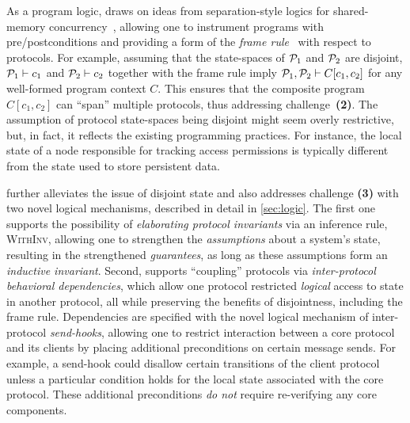 As a program logic, \disel draws on ideas from separation-style logics
for shared-memory
concurrency~\cite{Nanevski-al:ESOP14,Turon-al:OOPSLA14}, allowing one
to instrument programs with pre/postconditions and providing a form of
the \emph{frame rule}~\cite{Reynolds:LICS02} with respect to
protocols. For example, assuming that the state-spaces of $\mathcal{P}_1$ and
$\mathcal{P}_2$ are disjoint, $\mathcal{P}_1 \vdash c_1$ and $\mathcal{P}_2 \vdash c_2$
together with the frame rule imply $\mathcal{P}_1, \mathcal{P}_2 \vdash C[c_1, c_2]$
for any well-formed program context $C$.
%
This ensures that
the composite program $C[c_1, c_2]$ can ``span''
multiple protocols, thus addressing challenge~\textbf{(2)}.
%
The assumption of protocol state-spaces being disjoint might seem overly
restrictive, but, in fact, it reflects the existing programming
practices.
%
For instance, the local state of a node responsible for
tracking access permissions is typically different from the state
used to store persistent data.

\disel further alleviates the issue of disjoint state and also
addresses challenge \textbf{(3)} with two novel logical mechanisms,
described in detail in \cref{sec:logic}.
%
The first one supports the possibility of \emph{elaborating protocol
  invariants} via an inference rule, \textsc{WithInv}, allowing one to
strengthen the \emph{assumptions} about a system's state, resulting in
the strengthened \emph{guarantees}, as long as these assumptions form
an \emph{inductive invariant}.
%
Second, \disel supports ``coupling'' protocols via
\emph{inter-protocol behavioral dependencies}, which allow one
protocol restricted \emph{logical} access to state in another
protocol, all while preserving the benefits of disjointness, including
the frame rule.
%
Dependencies are specified with the novel logical mechanism of
inter-protocol \emph{send-hooks}, allowing one to restrict interaction
between a core protocol and its clients by placing additional
preconditions on certain message sends.
%
For example, a send-hook could disallow certain transitions of the
client protocol unless a particular condition holds for the local
state associated with the core protocol.
%
These additional preconditions \emph{do not} require re-verifying any
core components.



